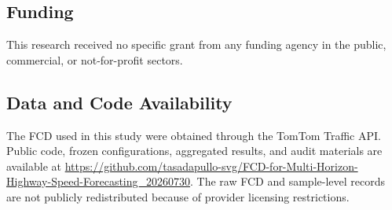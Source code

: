 \documentclass[pdflatex,sn-mathphys-num,iicol]{sn-jnl}
\begin{document}

\subsection*{Funding}

This research received no specific grant from any funding agency in the public, commercial, or not-for-profit sectors.



\subsection*{Data and Code Availability}

The FCD used in this study were obtained through the TomTom Traffic API. Public code, frozen configurations, aggregated results, and audit materials are available at \url{https://github.com/tasadapullo-svg/FCD-for-Multi-Horizon-Highway-Speed-Forecasting_20260730}. The raw FCD and sample-level records are not publicly redistributed because of provider licensing restrictions.




\end{document}
